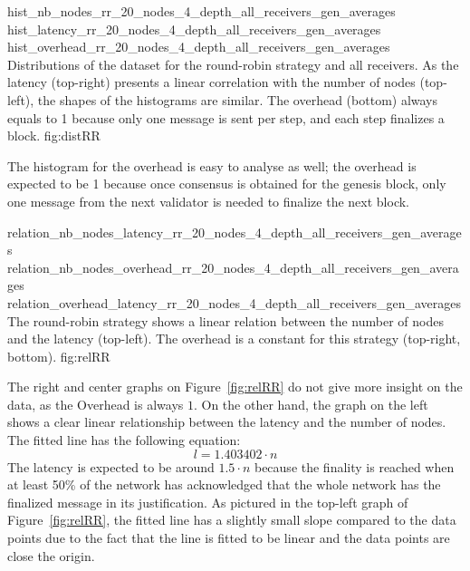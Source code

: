 \triplefigure
    {hist_nb_nodes_rr_20_nodes_4_depth_all_receivers_gen_averages}
    {hist_latency_rr_20_nodes_4_depth_all_receivers_gen_averages}
    {hist_overhead_rr_20_nodes_4_depth_all_receivers_gen_averages}
    {Distributions of the dataset for the round-robin strategy and all
    receivers. As the latency (top-right) presents a linear correlation with the number of
    nodes (top-left), the shapes of the histograms are similar. The overhead
    (bottom) always
    equals to 1 because only one message is sent per step, and each step
    finalizes a block.}
    {fig:distRR}

The histogram for the overhead is easy to analyse as well; the overhead is
expected to be 1 because once consensus is obtained for the genesis block, only
one message from the next validator is needed to finalize the next block.

\triplefigure
    {relation_nb_nodes_latency_rr_20_nodes_4_depth_all_receivers_gen_averages}
    {relation_nb_nodes_overhead_rr_20_nodes_4_depth_all_receivers_gen_averages}
    {relation_overhead_latency_rr_20_nodes_4_depth_all_receivers_gen_averages}
    {The round-robin strategy shows a linear relation between the number of
    nodes and the latency (top-left). The overhead is a constant for this
    strategy (top-right, bottom).}
    {fig:relRR}

The right and center graphs on Figure~\ref{fig:relRR} do not give more insight on the
data, as the Overhead is always \(1\). On the other hand, the graph on the left
shows a clear linear relationship between the latency and the number of nodes.
The fitted line has the following equation:
\[l = 1.403402\cdot n\]
The latency is expected to be around \(1.5\cdot n\) because the finality is
reached when at least 50\% of the network has acknowledged that the whole
network has the finalized message in its justification. As pictured in the
top-left graph of Figure~\ref{fig:relRR}, the fitted line has a slightly small
slope compared to the data points due to the fact that the line is fitted to be
linear and the data points are close the origin. 

